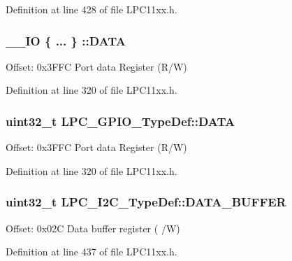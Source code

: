 Definition at line 428 of file L\+P\+C11xx.\+h.

\subsubsection[{\texorpdfstring{D\+A\+TA}{DATA}}]{\setlength{\rightskip}{0pt plus 5cm}\+\_\+\+\_\+\+IO \{ ... \} \+::D\+A\+TA}\hypertarget{group___l_p_c11xx___definitions_gacaeff8043a3d85a01f1351d68367d76c}{}\label{group___l_p_c11xx___definitions_gacaeff8043a3d85a01f1351d68367d76c}
Offset\+: 0x3\+F\+FC Port data Register (R/W) 

Definition at line 320 of file L\+P\+C11xx.\+h.

\subsubsection[{\texorpdfstring{D\+A\+TA}{DATA}}]{ uint32\+\_\+t L\+P\+C\+\_\+\+G\+P\+I\+O\+\_\+\+Type\+Def\+::\+D\+A\+TA}\hypertarget{group___l_p_c11xx___definitions_gaef9bb9639cb3af843526756c06ff763e}{}\label{group___l_p_c11xx___definitions_gaef9bb9639cb3af843526756c06ff763e}
Offset\+: 0x3\+F\+FC Port data Register (R/W) 

Definition at line 320 of file L\+P\+C11xx.\+h.

\subsubsection[{\texorpdfstring{D\+A\+T\+A\+\_\+\+B\+U\+F\+F\+ER}{DATA_BUFFER}}]{ uint32\+\_\+t L\+P\+C\+\_\+\+I2\+C\+\_\+\+Type\+Def\+::\+D\+A\+T\+A\+\_\+\+B\+U\+F\+F\+ER}\hypertarget{group___l_p_c11xx___definitions_gad1e68823c832452aa2d0b4d9be4ba122}{}\label{group___l_p_c11xx___definitions_gad1e68823c832452aa2d0b4d9be4ba122}
Offset\+: 0x02C Data buffer register ( /W) 

Definition at line 437 of file L\+P\+C11xx.\+h.

